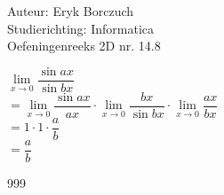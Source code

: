 \documentclass[a4paper]{article}
\begin{document}
  
\noindent \large Auteur: Eryk Borczuch \\
\noindent \large Studierichting: Informatica\\
\noindent \large Oefeningenreeks 2D nr. 14.8\\

\medskip

\normalsize

$\lim\limits_{x \rightarrow 0} \dfrac{\sin ax}{\sin bx} $\\

$= \lim\limits_{x \rightarrow 0} \dfrac{\sin ax}{ax} \cdot \lim\limits_{x \rightarrow 0} \dfrac{bx}{\sin bx} \cdot \lim\limits_{x \rightarrow 0} \dfrac{ax}{bx}$\\

$= 1 \cdot1 \cdot \dfrac{a}{b}$\\

$= \dfrac{a}{b}$
\begin{thebibliography}{999}
\end{thebibliography}
\end{document}
